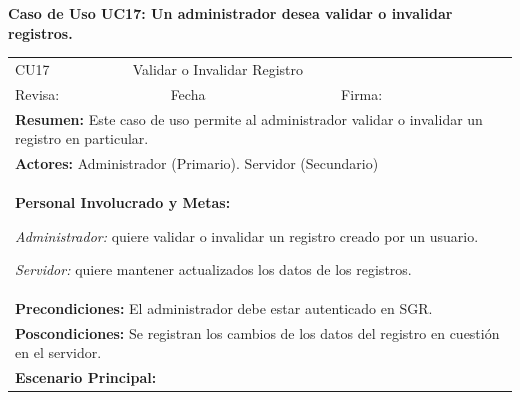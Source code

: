 		\textbf{Caso de Uso UC17: Un administrador desea validar o invalidar registros.}
			\begin{longtable}{|l|p{5.5cm}|l|p{2cm}|l|p{1.9cm}|} \hline
					\cellcolor{grisOscuro} CU17 & \multicolumn{4}{|l|}{  \cellcolor{grisOscuro} Validar o Invalidar Registro} &  \cellcolor{grisClaro}\multirow{2}{1cm}{} \\ \cline{1-5}
					\cellcolor{grisOscuro} Revisa: &  \cellcolor{grisClaro} &  \cellcolor{grisOscuro} Fecha &  \cellcolor{grisClaro} &  \cellcolor{grisOscuro} Firma: & \cellcolor{grisClaro} \\ \hline
					\multicolumn{6}{|p{15cm}|}{ \textbf{Resumen: } Este caso de uso permite al administrador validar o invalidar un registro en particular.

					} \\ \hline

					\multicolumn{6}{|p{15cm}|}{ \textbf{Actores: } Administrador (Primario). Servidor (Secundario)

					} \\ \hline

					\multicolumn{6}{|p{15cm}|}{ \textbf{Personal Involucrado y Metas: }
					
					\emph{Administrador:} quiere validar o invalidar un registro creado por un usuario.

					\emph{Servidor:} quiere mantener actualizados los datos de los registros.

					} \\ \hline

					\multicolumn{6}{|p{15cm}|}{ \textbf{Precondiciones: } El administrador debe estar autenticado en SGR.

					} \\ \hline

					\multicolumn{6}{|p{15cm}|}{ \textbf{Poscondiciones: } Se registran los cambios de los datos del registro en cuestión en el servidor.

					} \\ \hline

					\multicolumn{6}{|p{15cm}|}{ \textbf{Escenario Principal: }

}
\end{longtable}
